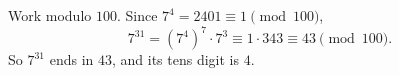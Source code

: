 Work modulo $100$. Since $7^4=2401\equiv1\pmod{100}$,
\[
7^{31}=\left(7^4\right)^7\cdot7^3\equiv1\cdot343\equiv43\pmod{100}.
\]
So $7^{31}$ ends in $43$, and its tens digit is $\boxed{4}$.
